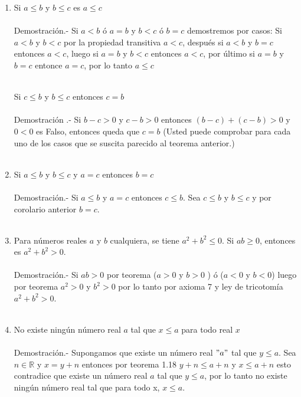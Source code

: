 \begin{enumerate}
\item Si $a \leq b $ y $b \leq c$ es $a\leq c$\\\\
Demostración.- \; Si $a<b$ ó $a=b$ y $b<c$ ó $b=c$ demostremos por casos: Si $a<b$ y $b<c$ por la propiedad transitiva $a<c$, después si $a<b$ y $b=c$ entonces $a<c$, luego si $a=b$ y $b<c$ entonces $a<c$,  por último si $a=b$ y $b=c$ entonce $a=c$, por lo tanto $a\leq c$\\\\

\begin{col.}
Si $c\leq b$ y $b \leq c$ entonces $c=b$\\\\
Demostración .- \; Si $b-c>0$ y $c-b>0$ entonces $(b-c)+(c-b)>0$ y $0<0$ es Falso, entonces queda que $c=b$ (Usted puede comprobar para cada uno de los casos que se suscita parecido al teorema anterior.)\\\\
\end{col.}

\item Si $a\leq b$ y $b \leq c$ y $a=c$ entonces $b=c$\\\\
Demostración.- \; Si $a\leq b$\;  y \; $a=c$ entonces $c\leq b$. Sea $c\leq b$ \; y \; $b\leq c$ y por corolario anterior \; $b=c$.\\\\

\item Para números reales $a$ y $b$ cualquiera, se tiene $a^2+b^2\leq 0$. Si $ab\geq 0$, entonces es $a^2+b^2>0$.\\\\
Demostración.- \; Si $ab>0$ por teorema  ($a>0$ y $b>0$ ) ó ($a<0$ y $b<0$) luego por teorema  $a^2>0$ y $b^2>0$ por lo tanto por axioma 7 y ley de tricotomía $a^2+b^2>0$.\\\\ 

\item No existe ningún número real $a$ tal que $x\leq a$ para todo real $x$\\\\
Demostración.- \; Supongamos que existe un número real $" a "$ tal que $y \leq a$. Sea $n\in \mathbb{R}$ \; y \; $x=y+n$ entonces por teorema 1.18 \; $y+n \leq a+n$ \; y \; $x\leq a+n$ esto contradice que existe un número real $a$ tal que $y\leq a$, por lo tanto no existe ningún número real tal que para todo x, $x\leq a$.\\\\


\end{enumerate}
